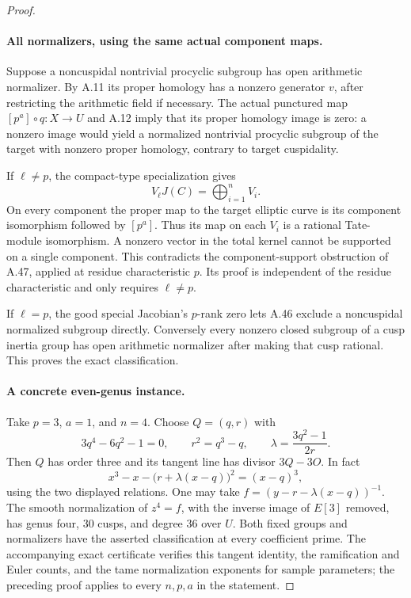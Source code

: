 \begin{proof}
\paragraph{All normalizers, using the same actual component maps.}
Suppose a noncuspidal nontrivial procyclic subgroup
has open arithmetic normalizer. By A.11 its proper
homology has a nonzero generator \(v\), after
restricting the arithmetic field if necessary.
The actual punctured map
\([p^a]\circ q:X\to U\) and A.12 imply that
its proper homology image is zero: a nonzero image
would yield a normalized nontrivial procyclic
subgroup of the target with nonzero proper homology,
contrary to target cuspidality.

If \(\ell\ne p\), the compact-type specialization
gives
\[
                     V_\ell J(C)=\bigoplus_{i=1}^nV_i.
\]
On every component the proper map to the target
elliptic curve is its component isomorphism followed
by \([p^a]\). Thus its map on each \(V_i\)
is a rational Tate-module isomorphism. A nonzero
vector in the total kernel cannot be supported
on a single component. This contradicts the
component-support obstruction of A.47, applied at
residue characteristic \(p\). Its proof is
independent of the residue characteristic and only
requires \(\ell\ne p\).

If \(\ell=p\), the good special Jacobian's
\(p\)-rank zero lets A.46 exclude a noncuspidal
normalized subgroup directly. Conversely every
nonzero closed subgroup of a cusp inertia group
has open arithmetic normalizer after making that
cusp rational. This proves the exact classification.

\paragraph{A concrete even-genus instance.}
Take \(p=3\), \(a=1\), and \(n=4\).
Choose \(Q=(q,r)\) with
\[
          3q^4-6q^2-1=0,
          \qquad r^2=q^3-q,
          \qquad \lambda=\frac{3q^2-1}{2r}.
\]
Then \(Q\) has order three and its tangent
line has divisor \(3Q-3O\). In fact
\[
       x^3-x-\bigl(r+\lambda(x-q)\bigr)^2=(x-q)^3,
                                                               \tag{A.49.6}
\]
using the two displayed relations. One may take
\(f=(y-r-\lambda(x-q))^{-1}\). The smooth
normalization of \(z^4=f\), with the inverse
image of \(E[3]\) removed, has genus four,
\(30\) cusps, and degree \(36\) over \(U\).
Both fixed groups and normalizers have the asserted
classification at every coefficient prime. The
accompanying exact certificate verifies this tangent
identity, the ramification and Euler counts, and
the tame normalization exponents for sample parameters;
the preceding proof applies to every \(n,p,a\)
in the statement.
\end{proof}
